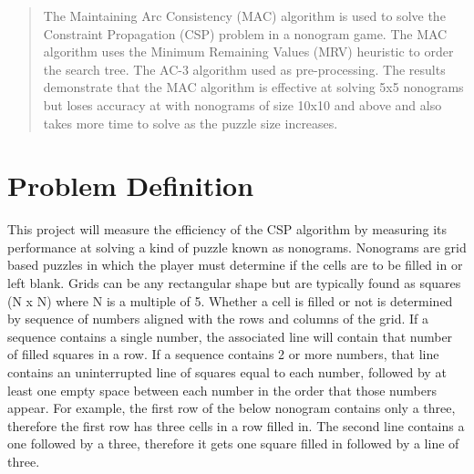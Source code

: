 \documentclass[12pt, letterpaper]
{article}
\begin{document}
\nocite{*}

% 

{}
\setcounter{lastroman}{\value{page}}
\maketitle
\begin{abstract}
    The Maintaining Arc Consistency (MAC) algorithm is used to solve the Constraint Propagation (CSP) problem in a nonogram game. The MAC algorithm uses the Minimum Remaining Values (MRV) heuristic to order the search tree. The AC-3 algorithm used as pre-processing. The results demonstrate that the MAC algorithm is effective at solving 5x5 nonograms but loses accuracy at with nonograms of size 10x10 and above and also takes more time to solve as the puzzle size increases.
\end{abstract}
\section{Problem Definition}
    This project will measure the efficiency of the CSP algorithm by measuring its performance at solving a kind of puzzle known as nonograms.  Nonograms are grid based puzzles in which the player must determine if the cells are to be filled in or left blank. Grids can be any rectangular shape but are typically found as squares (N x N) where N is a multiple of 5. Whether a cell is filled or not is determined by sequence of numbers aligned with the rows and columns of the grid. If a sequence contains a single number, the associated line will contain that number of filled squares in a row. If a sequence contains 2 or more numbers, that line contains an uninterrupted line of squares equal to each number, followed by at least one empty space between each number in the order that those numbers appear. For example, the first row of the below nonogram contains only a three, therefore the first row has three cells in a row filled in. The second line contains a one followed by a  three, therefore it gets one square filled in followed by a line of three.
\end{document}
